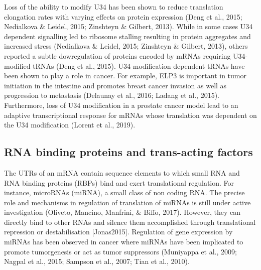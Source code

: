 \documentclass[12pt,openany]{book}
\begin{document}
Loss of the ability to modify U34 has been shown to reduce translation
elongation rates with varying effects on protein expression (Deng et
al., 2015; Nedialkova \& Leidel, 2015; Zinshteyn \& Gilbert, 2013).
While in some cases U34 dependent signalling led to ribosome stalling
resulting in protein aggregates and increased stress (Nedialkova \&
Leidel, 2015; Zinshteyn \& Gilbert, 2013), others reported a subtle
dowregulation of proteins encoded by mRNAs requiring U34-modified tRNAs
(Deng et al., 2015). U34 modification dependent tRNAs have been shown to
play a role in cancer. For example, ELP3 is important in tumor
initiation in the intestine and promotes breast cancer invasion as well
as progression to metastasis (Delaunay et al., 2016; Ladang et al.,
2015). Furthermore, loss of U34 modification in a prostate cancer model
lead to an adaptive transcriptional response for mRNAs whose translation
was dependent on the U34 modification (Lorent et al., 2019).

\subsection{RNA binding proteins and trans-acting factors}

The UTRs of an mRNA contain sequence elements to which small RNA and RNA
binding proteins (RBPs) bind and exert translational regulation. For
instance, microRNAs (miRNA), a small class of non coding RNA. The
precise role and mechanisms in regulation of translation of miRNAs is
still under active investigation (Oliveto, Mancino, Manfrini, \& Biffo,
2017). However, they can directly bind to other RNAs and silence them
accomplished through translational repression or destabilisation
{[}Jonas2015{]}. Regulation of gene expression by miRNAs has been
observed in cancer where miRNAs have been implicated to promote
tumorgenesis or act as tumor suppressors (Muniyappa et al., 2009; Nagpal
et al., 2015; Sampson et al., 2007; Tian et al., 2010).
\end{document}
